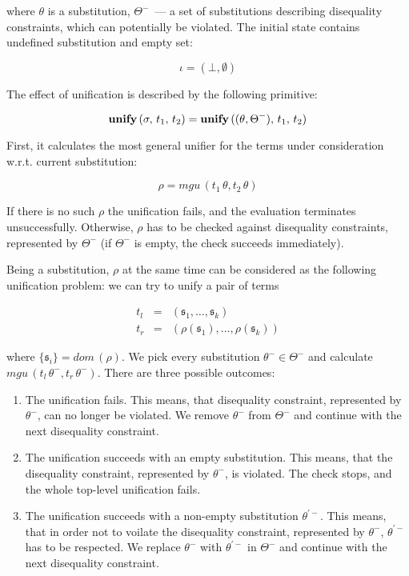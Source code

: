 \noindent where $\theta$ is a substitution, $\Theta^-$~--- a set of substitutions describing disequality constraints, 
which can potentially be violated. The initial state contains undefined substitution and empty set:

$$
\iota=(\bot,\emptyset)
$$

The effect of unification is described by the following primitive:

$$
{\bf unify}\,(\sigma,\,t_1,\,t_2)={\bf unify}\,((\theta,\Theta^-),\,t_1,\,t_2)
$$

First, it calculates the most general unifier for the terms under consideration w.r.t. current substitution:

$$
\rho=mgu\,(t_1\,\theta,t_2\,\theta)
$$

If there is no such $\rho$ the unification fails, and the evaluation terminates unsuccessfully. Otherwise,
$\rho$ has to be checked against disequality constraints, represented by $\Theta^-$ (if $\Theta^-$ is empty, the
check succeeds immediately).

Being a substitution, $\rho$ at the same time can be considered as the following unification problem: we can try to unify a pair of terms 

$$
\begin{array}{rcl}
t_l&=&(\mathfrak s_1,\dots,\mathfrak s_k)\\
t_r&=&(\rho(\mathfrak s_1),\dots,\rho(\mathfrak s_k))
\end{array}
$$

\noindent where $\{\mathfrak s_i\}=dom\,(\rho)$. We pick every substitution $\theta^-\in\Theta^-$ and calculate 
$mgu\,(t_l\,\theta^-,t_r\,\theta^-)$. There are three possible outcomes:

\begin{enumerate}
\item The unification fails. This means, that disequality constraint, represented by $\theta^-$, can no
longer be violated. We remove $\theta^-$ from $\Theta^-$ and continue with the next disequality constraint.
\item The unification succeeds with an empty substitution. This means, that the
disequality constraint, represented by $\theta^-$, is violated. The check stops, and the whole top-level 
unification fails.
\item The unification succeeds with a non-empty substitution $\theta^{\prime-}$. This means, that in order not to 
voilate the disequality constraint, represented by $\theta^-$, $\theta^{\prime-}$ has to be respected. We replace
$\theta^-$ with $\theta^{\prime-}$ in $\Theta^-$ and continue with the next disequality constraint.
\end{enumerate}

